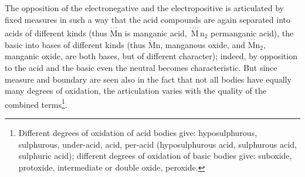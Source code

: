 \documentclass[12pt,a4paper]{book}
\begin{document}
The opposition of the electronegative and the electropositive is articulated by
fixed measures in such a way that the acid compounds are again separated into
acids of different kinds (thus
$\stackrel{\cdot\cdot\cdot}{\mathrm{M}}\mathrm{n}$ is manganic acid,
$\stackrel{\stackrel{\cdot\cdot\cdot}{\cdot\cdot\cdot\cdot}}{\mathrm{M}}\mathrm{n}_2$
permanganic acid), the basic into bases of different kinds (thus
$\dot{\mathrm{M}}\mathrm{n}$, manganous oxide, and
$\stackrel{\cdot\cdot\cdot}{\mathrm{M}}\mathrm{n}_2$,
manganic oxide, are both bases, but of different character); indeed, by
opposition to the acid and the basic even the neutral becomes characteristic.
But since measure and boundary are seen also in the fact that not all bodies
have equally many degrees of oxidation, the articulation varies with the
quality of the combined
terms\footnote{Different degrees of oxidation of acid bodies give:
hyposulphurous, sulphurous, under-acid, acid, per-acid (hyposulphurous acid,
sulphurous acid, sulphuric acid); different degrees of oxidation of basic
bodies give: suboxide, protoxide, intermediate or double oxide, peroxide.}.
\setcounter{footnote}{0}
\end{document}
